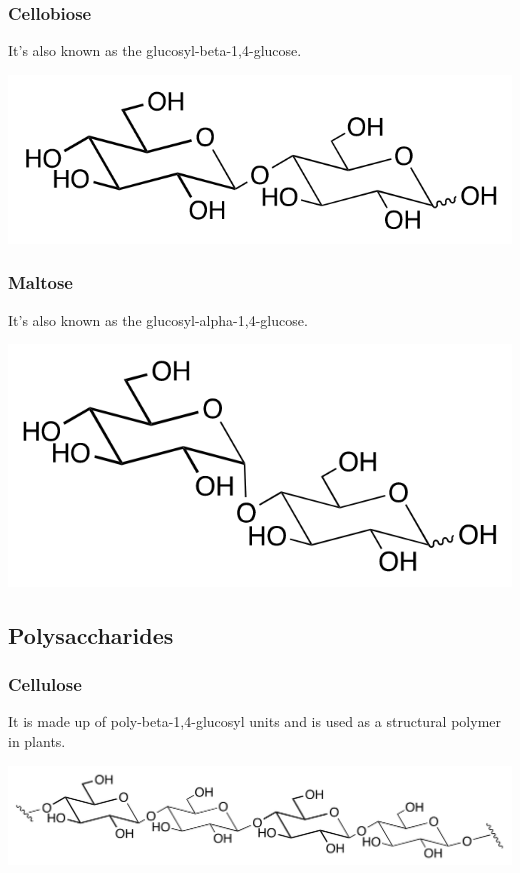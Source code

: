 \documentclass[11pt]{article}
\begin{document}
\subsubsection{Cellobiose}
\label{sec:org84f9bcb}
It's also known as the glucosyl-beta-1,4-glucose.
\begin{center}
\includegraphics[width=.9\linewidth]{./images/cellobiose.png}
\end{center}

\newpage
\subsubsection{Maltose}
\label{sec:org68c9229}
It's also known as the glucosyl-alpha-1,4-glucose.
\begin{center}
\includegraphics[width=.9\linewidth]{./images/maltose.png}
\end{center}
\subsection{Polysaccharides}
\label{sec:orga1410b7}

\subsubsection{Cellulose}
\label{sec:orgabc71bb}
It is made up of poly-beta-1,4-glucosyl units and is used as a structural polymer in plants.
\begin{center}
\includegraphics[width=.9\linewidth]{./images/cellulose.png}
\end{center}
\end{document}
